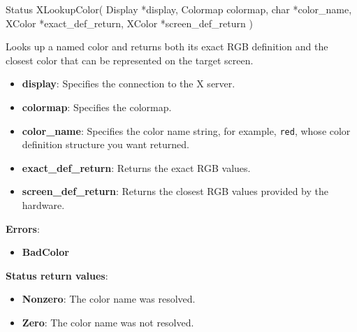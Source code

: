 \documentclass{report}
\begin{document}
\begin{itemize}
            \begin{cppcode}
                Status XLookupColor(
                    Display *display,
                    Colormap colormap,
                    char *color_name,
                    XColor *exact_def_return,
                    XColor *screen_def_return
                )
            \end{cppcode}
            \bigbreak \noindent
            Looks up a named color and returns both its exact RGB definition and the closest color that can be represented on the target screen.
            \begin{itemize}
                \item \textbf{display}: Specifies the connection to the X server.
                \item \textbf{colormap}: Specifies the colormap.
                \item \textbf{color\_name}: Specifies the color name string, for example, \texttt{red}, whose color definition structure you want returned.
                \item \textbf{exact\_def\_return}: Returns the exact RGB values.
                \item \textbf{screen\_def\_return}: Returns the closest RGB values provided by the hardware.
            \end{itemize}
            \bigbreak \noindent
            \textbf{Errors}:
            \begin{itemize}
                \item \textbf{BadColor}
            \end{itemize}
            \bigbreak \noindent
            \textbf{Status return values}:
            \begin{itemize}
                \item \textbf{Nonzero}: The color name was resolved.
                \item \textbf{Zero}: The color name was not resolved.
            \end{itemize}


\end{itemize}
\end{document}
